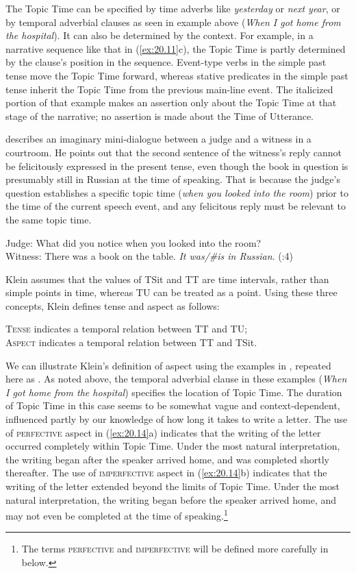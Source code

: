 The Topic Time can be specified by time adverbs like \textit{yesterday} or \textit{next year}, or by temporal adverbial clauses as seen in example  above (\textit{When I got home from the hospital}). It can also be determined by the context. For example, in a narrative sequence like that in (\ref{ex:20.11}c), the Topic Time is partly determined by the clause’s position in the sequence. Event-type verbs in the simple past tense move the Topic Time forward, whereas stative predicates in the simple past tense inherit the Topic Time from the previous main-line event. The italicized portion of that example makes an assertion only about the Topic Time at that stage of the narrative; no assertion is made about the Time of Utterance.



\citet[4]{Klein1994} describes an imaginary mini-dialogue between a judge and a witness in a courtroom. He points out that the second sentence of the witness’s reply cannot be felicitously expressed in the present tense, even though the book in question is presumably still in Russian at the time of speaking. That is because the judge’s question establishes a specific topic time (\textit{when you looked into the room}) prior to the time of the current speech event, and any felicitous reply must be relevant to the same topic time.


\ea \label{ex:20.12}
Judge: What did you notice when you looked into the room?\\
Witness: There was a book on the table. \textit{It was/\#is in Russian}.   (\citealt{Klein1994}:4)
\z


Klein assumes that the values of TSit and TT are time intervals, rather than simple points in time, whereas TU can be treated as a point. Using these three concepts, Klein defines tense and aspect as follows:


\ea \label{ex:20.13}
\ea  \textsc{Tense} indicates a temporal relation between TT and TU;\\
\ex \textsc{Aspect} indicates a temporal relation between TT and TSit.
\z \z


We can illustrate Klein’s definition of aspect using the examples in , repeated here as . As noted above, the temporal adverbial clause in these examples (\textit{When I got home from the hospital}) specifies the location of Topic Time. The duration of Topic Time in this case seems to be somewhat vague and context-dependent, influenced partly by our knowledge of how long it takes to write a letter. The use of \textsc{perfective} aspect in (\ref{ex:20.14}a) indicates that the writing of the letter occurred completely within Topic Time. Under the most natural interpretation, the writing began after the speaker arrived home, and was completed shortly thereafter. The use of \textsc{imperfective} aspect in (\ref{ex:20.14}b) indicates that the writing of the letter extended beyond the limits of Topic Time. Under the most natural interpretation, the writing began before the speaker arrived home, and may not even be completed at the time of speaking.\footnote{The terms \textsc{perfective} and \textsc{imperfective} will be defined more carefully in  below.}


